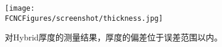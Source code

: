 \begin{figure}[H]
\centering
\texttt{[image: \\FCNCFigures/screenshot/thickness.jpg]}
\caption{对Hybrid厚度的测量结果，厚度的偏差位于误差范围以内。}
\label{fig:thickness}
\end{figure}